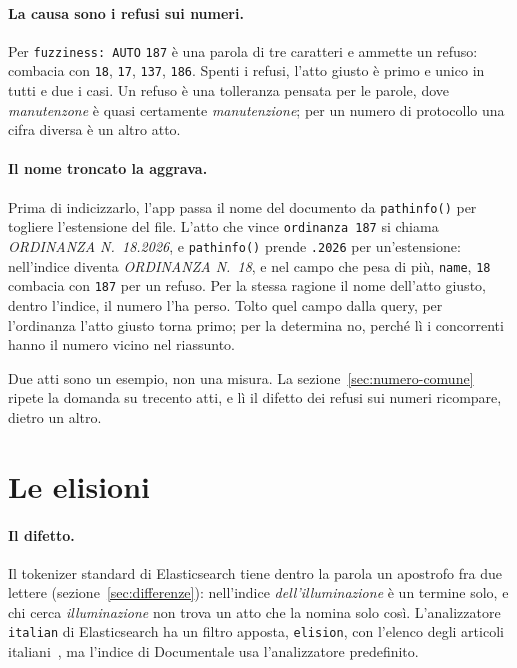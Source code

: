 \paragraph{La causa sono i refusi sui numeri.} Per \texttt{fuzziness: AUTO}
\texttt{187} è una parola di tre caratteri e ammette un refuso: combacia con
\texttt{18}, \texttt{17}, \texttt{137}, \texttt{186}. Spenti i refusi, l'atto
giusto è primo e unico in tutti e due i casi. Un refuso è una tolleranza pensata
per le parole, dove \emph{manutenzone} è quasi certamente \emph{manutenzione}; per
un numero di protocollo una cifra diversa è un altro atto.

\paragraph{Il nome troncato la aggrava.} Prima di indicizzarlo, l'app passa il nome
del documento da \texttt{pathinfo()} per togliere l'estensione del file. L'atto
che vince \texttt{ordinanza 187} si chiama \emph{ORDINANZA N.~18.2026}, e
\texttt{pathinfo()} prende \texttt{.2026} per un'estensione: nell'indice diventa
\emph{ORDINANZA N.~18}, e nel campo che pesa di più, \texttt{name}, \texttt{18}
combacia con \texttt{187} per un refuso. Per la stessa ragione il nome
dell'atto giusto, dentro l'indice, il numero l'ha perso. Tolto quel campo dalla query, per
l'ordinanza l'atto giusto torna primo; per la determina no, perché lì i
concorrenti hanno il numero vicino nel riassunto.

Due atti sono un esempio, non una misura. La sezione~\ref{sec:numero-comune}
ripete la domanda su trecento atti, e lì il difetto dei refusi sui numeri
ricompare, dietro un altro.

\section{Le elisioni}\label{sec:elisioni}

\paragraph{Il difetto.} Il tokenizer standard di Elasticsearch tiene dentro la
parola un apostrofo fra due lettere (sezione~\ref{sec:differenze}): nell'indice
\emph{dell'illuminazione} è un termine solo, e chi cerca \emph{illuminazione} non
trova un atto che la nomina solo così. L'analizzatore \texttt{italian} di
Elasticsearch ha un filtro apposta, \texttt{elision}, con l'elenco degli articoli
italiani~\cite{es-italian}, ma l'indice di Documentale usa l'analizzatore
predefinito.

